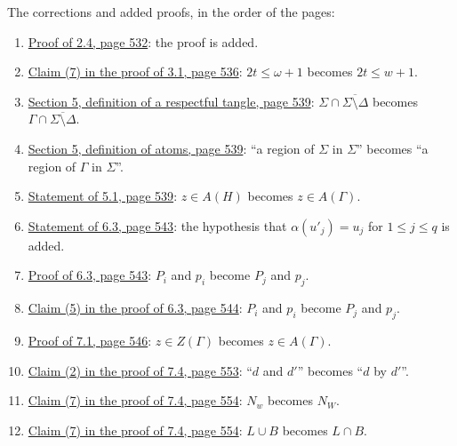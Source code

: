 The corrections and added proofs, in the order of the pages:
\begin{enumerate}\setlength{\itemsep}{1pt}
\item {}\hyperref[fix:2.4-proof-added]{Proof of 2.4, page 532}: the proof is added.
\item {}\hyperref[fix:3.1-claim7]{Claim (7) in the proof of 3.1, page 536}: $2t \le \omega + 1$
becomes $2t \le w + 1$.
\item {}\hyperref[fix:5-respectful]{Section 5, definition of a respectful tangle, page 539}:
$\Sigma \cap \overline{\Sigma \setminus \Delta}$ becomes
$\Gamma \cap \overline{\Sigma \setminus \Delta}$.
\item {}\hyperref[fix:5-atoms]{Section 5, definition of atoms, page 539}: ``a region of $\Sigma$
in $\Sigma$'' becomes ``a region of $\Gamma$ in $\Sigma$''.
\item {}\hyperref[fix:5.1]{Statement of 5.1, page 539}: $z \in A(H)$ becomes $z \in A(\Gamma)$.
\item {}\hyperref[fix:6.3]{Statement of 6.3, page 543}: the hypothesis that $\alpha(u'_j) = u_j$ for
$1 \le j \le q$ is added.
\item {}\hyperref[fix:6.3-proof]{Proof of 6.3, page 543}: $P_i$ and $p_i$ become $P_j$ and $p_j$.
\item {}\hyperref[fix:6.3-claim5]{Claim (5) in the proof of 6.3, page 544}: $P_i$ and $p_i$
become $P_j$ and $p_j$.
\item {}\hyperref[fix:7.1-proof]{Proof of 7.1, page 546}: $z \in Z(\Gamma)$ becomes
$z \in A(\Gamma)$.
\item {}\hyperref[fix:7.4-claim2]{Claim (2) in the proof of 7.4, page 553}: ``$d$ and $d'$''
becomes ``$d$ by $d'$''.
\item {}\hyperref[fix:7.4-claim7a]{Claim (7) in the proof of 7.4, page 554}: $N_w$ becomes $N_W$.
\item {}\hyperref[fix:7.4-claim7b]{Claim (7) in the proof of 7.4, page 554}: $L \cup B$ becomes
$L \cap B$.
\end{enumerate}
